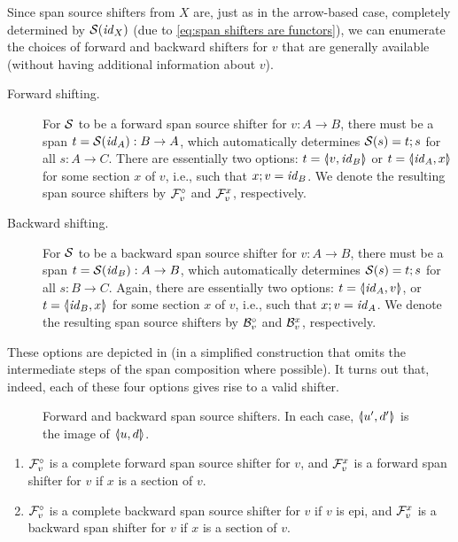 Since span source shifters from $X$ are, just as in the arrow-based case, completely determined by $\mathcal{S}(\mathit{id}_X)$ (due to \eqref{eq:span shifters are functors}), we can enumerate the choices of forward and backward shifters for $v$ that are generally available (without having additional information about $v$).
%
\begin{description}
\item[Forward shifting.] For $\mathcal{S}$ to be a forward span source shifter for $v:A\to B$, there must be a span $t=\mathcal{S}(\mathit{id}_A):B\to A$, which automatically determines $\mathcal{S}(s)=t;s$ for all $s:A\to C$. There are essentially two options: $t=\spanof{v}{\id_B}$ or $t=\spanof{\id_A}{x}$ for some section $x$ of $v$, i.e., such that $x;v=\mathit{id}_B$. We denote the resulting span source shifters by $\mathcal{F}_v^\circ$ and $\mathcal{F}_v^x$, respectively.

\item[Backward shifting.] For $\mathcal{S}$ to be a backward span source shifter for $v:A\to B$, there must be a span $t=\mathcal{S}(\mathit{id}_B):A\to B$, which automatically determines $\mathcal{S}(s)=t;s$ for all $s:B\to C$. Again, there are essentially two options: $t=\spanof{\id_A}{v}$, or $t=\spanof{\id_B}{x}$ for some section $x$ of $v$, i.e., such that $x;v=\mathit{id}_A$. We denote the resulting span source shifters by $\mathcal{B}_v^\circ$ and $\mathcal{B}_v^x$, respectively.
\end{description}
%
These options are depicted in  (in a simplified construction that omits the intermediate steps of the span composition where possible). It turns out that, indeed, each of these four options gives rise to a valid shifter.
%
\begin{figure}
\centering

\caption{Forward and backward span source shifters. In each case, $\spanof{u'}{d'}$ is the image of $\spanof{u}{d}$.}
\end{figure}
%
\begin{proposition}
\begin{enumerate}
\item $\mathcal{F}_v^\circ$ is a complete forward span source shifter for $v$, and $\mathcal{F}_v^x$ is a forward span shifter for $v$ if $x$ is a section of $v$.
\item $\mathcal{F}_v^\circ$ is a complete backward span source shifter for $v$ if $v$ is epi, and $\mathcal{F}_v^x$ is a backward span shifter for $v$ if $x$ is a section of $v$.
\end{enumerate}
\end{proposition}

